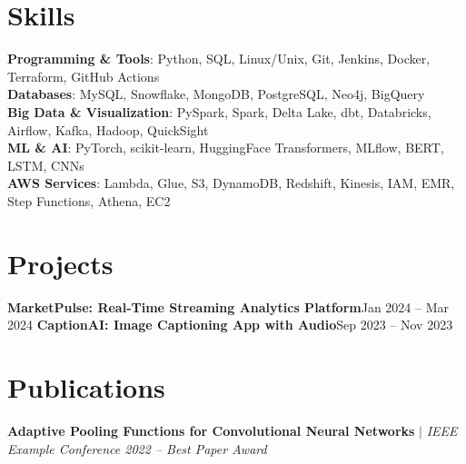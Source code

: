   \resumeSubHeadingListEnd

\section{Skills}
 \begin{itemize}[leftmargin=0.15in, label={}]
    \small{\item{
     \textbf{Programming \& Tools}{: Python, SQL, Linux/Unix, Git, Jenkins, Docker, Terraform, GitHub Actions} \\
     \textbf{Databases}{: MySQL, Snowflake, MongoDB, PostgreSQL, Neo4j, BigQuery} \\
     \textbf{Big Data \& Visualization}{: PySpark, Spark, Delta Lake, dbt, Databricks, Airflow, Kafka, Hadoop, QuickSight} \\
     \textbf{ML \& AI}{: PyTorch, scikit-learn, HuggingFace Transformers, MLflow, BERT, LSTM, CNNs} \\
     \textbf{AWS Services}{: Lambda, Glue, S3, DynamoDB, Redshift, Kinesis, IAM, EMR, Step Functions, Athena, EC2}
    }}
 \end{itemize}

\section{Projects}
    \resumeSubHeadingListStart
      \resumeProjectHeading
          {\textbf{MarketPulse: Real-Time Streaming Analytics Platform}}{Jan 2024 -- Mar 2024}
          \resumeItemListStart
          \resumeItemListEnd
      \resumeProjectHeading
          {\textbf{CaptionAI: Image Captioning App with Audio}}{Sep 2023 -- Nov 2023}
          \resumeItemListStart
          \resumeItemListEnd
    \resumeSubHeadingListEnd

\section{Publications}
    \resumeSubHeadingListStart
      \resumeProjectHeading
          {\textbf{Adaptive Pooling Functions for Convolutional Neural Networks} $|$ \emph{IEEE Example Conference 2022 -- Best Paper Award}}{}
          \resumeItemListStart
          \resumeItemListEnd
    \resumeSubHeadingListEnd

